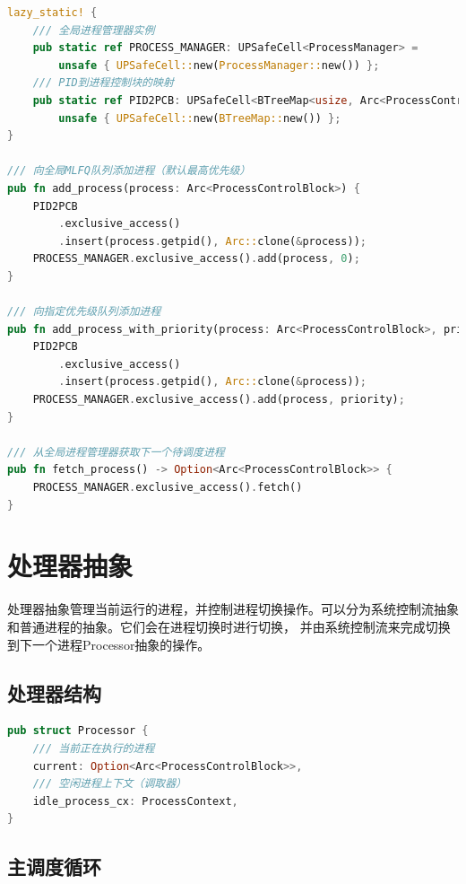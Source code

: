 \begin{lstlisting}[language=Rust,caption={全局进程管理器}, label={lst:global-manager}]
lazy_static! {
    /// 全局进程管理器实例
    pub static ref PROCESS_MANAGER: UPSafeCell<ProcessManager> =
        unsafe { UPSafeCell::new(ProcessManager::new()) };
    /// PID到进程控制块的映射
    pub static ref PID2PCB: UPSafeCell<BTreeMap<usize, Arc<ProcessControlBlock>>> =
        unsafe { UPSafeCell::new(BTreeMap::new()) };
}

/// 向全局MLFQ队列添加进程（默认最高优先级）
pub fn add_process(process: Arc<ProcessControlBlock>) {
    PID2PCB
        .exclusive_access()
        .insert(process.getpid(), Arc::clone(&process));
    PROCESS_MANAGER.exclusive_access().add(process, 0);
}

/// 向指定优先级队列添加进程
pub fn add_process_with_priority(process: Arc<ProcessControlBlock>, priority: usize) {
    PID2PCB
        .exclusive_access()
        .insert(process.getpid(), Arc::clone(&process));
    PROCESS_MANAGER.exclusive_access().add(process, priority);
}

/// 从全局进程管理器获取下一个待调度进程
pub fn fetch_process() -> Option<Arc<ProcessControlBlock>> {
    PROCESS_MANAGER.exclusive_access().fetch()
}
\end{lstlisting}

\section{处理器抽象}

处理器抽象管理当前运行的进程，并控制进程切换操作。可以分为系统控制流抽象和普通进程的抽象。它们会在进程切换时进行切换，
并由系统控制流来完成切换到下一个进程Processor抽象的操作。

\subsection{处理器结构}

\begin{lstlisting}[language=Rust,caption={处理器抽象结构}, label={lst:processor-structure}]
pub struct Processor {
    /// 当前正在执行的进程
    current: Option<Arc<ProcessControlBlock>>,
    /// 空闲进程上下文（调取器）
    idle_process_cx: ProcessContext,
}
\end{lstlisting}

\subsection{主调度循环}


